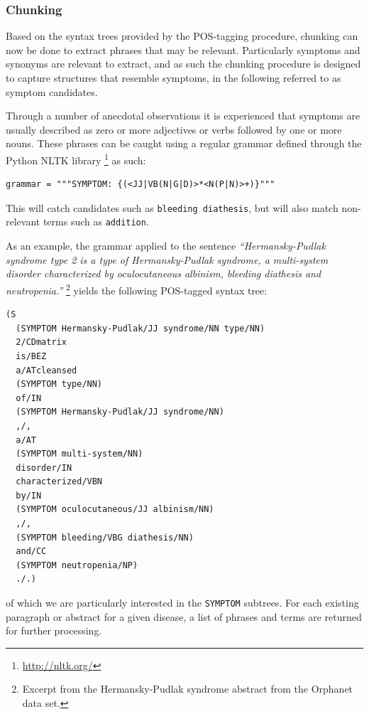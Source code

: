 \documentclass[10pt,letterpaper,two column,final]{article}
\begin{document}
\subsubsection{Chunking}
Based on the syntax trees provided by the POS-tagging procedure,
chunking can now be done to extract phrases that may be relevant.
Particularly symptoms and synonyms are relevant to extract, and as such
the chunking procedure is designed to capture structures that resemble
symptoms, in the following referred to as symptom candidates.

Through a number of anecdotal observations it is experienced that
symptoms are usually described as zero or more adjectives or verbs
followed by one or more nouns. These phrases can be caught using a
regular grammar defined through the Python NLTK library
\footnote{\url{http://nltk.org/}} as such:
\begin{lstlisting}
grammar = """SYMPTOM: {(<JJ|VB(N|G|D)>*<N(P|N)>+)}"""
\end{lstlisting}
This will catch candidates such as \texttt{bleeding diathesis}, but will
also match non-relevant terms such as \texttt{addition}.

As an example, the grammar applied to the sentence
\textit{``Hermansky-Pudlak syndrome type 2 is a type of Hermansky-Pudlak
syndrome, a multi-system disorder characterized by oculocutaneous
albinism, bleeding diathesis and neutropenia.''} \footnote{Excerpt from
the Hermansky-Pudlak syndrome abstract from the Orphanet data set.}
yields the following POS-tagged syntax tree:
\begin{lstlisting}
(S
  (SYMPTOM Hermansky-Pudlak/JJ syndrome/NN type/NN)
  2/CDmatrix
  is/BEZ
  a/ATcleansed 
  (SYMPTOM type/NN)
  of/IN
  (SYMPTOM Hermansky-Pudlak/JJ syndrome/NN)
  ,/,
  a/AT
  (SYMPTOM multi-system/NN)
  disorder/IN
  characterized/VBN
  by/IN
  (SYMPTOM oculocutaneous/JJ albinism/NN)
  ,/,
  (SYMPTOM bleeding/VBG diathesis/NN)
  and/CC
  (SYMPTOM neutropenia/NP)
  ./.)
\end{lstlisting}
of which we are particularly interested in the \texttt{SYMPTOM}
subtrees. For each existing paragraph or abstract for a given disease, a
list of phrases and terms are returned for further processing.
\end{document}
